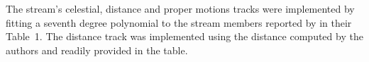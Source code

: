 The stream's celestial, distance and proper motions tracks were implemented by fitting a seventh degree polynomial to the stream members reported by \citet{Ibata2021} in their Table~1. The distance track was implemented using the distance computed by the authors and readily provided in the table.

